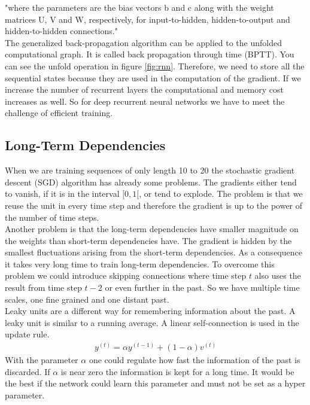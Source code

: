 "where the parameters are the bias vectors b and c along with the weight matrices U, V and W, respectively, for input-to-hidden, hidden-to-output and hidden-to-hidden connections."\cite[p.374]{DeepLearning}\\
The generalized back-propagation algorithm can be applied to the unfolded computational graph. It is called back propagation through time (BPTT). You can see the unfold operation in figure \ref{fig:rnn}. Therefore, we need to store all the sequential states because they are used in the computation of the gradient. If we increase the number of recurrent layers the computational and memory cost increases as well. So for deep recurrent neural networks we have to meet the challenge of efficient training.

\subsection{Long-Term Dependencies}
\label{sec:ltd}
When we are training sequences of only length 10 to 20 the stochastic gradient descent (SGD) algorithm has already some problems. The gradients either tend to vanish, if it is in the interval $[0, 1[$, or tend to explode. The problem is that we reuse the unit in every time step and therefore the gradient is up to the power of the number of time steps.\\
Another problem is that the long-term dependencies have smaller magnitude on the weights than short-term dependencies have. The gradient is hidden by the smallest fluctuations arising from the short-term dependencies. As a consequence it takes very long time to train long-term dependencies. To overcome this problem we could introduce skipping connections where time step $t$ also uses the result from time step $t-2$ or even further in the past. So we have multiple time scales, one fine grained and one distant past.\\
Leaky units are a different way for remembering information about the past. A leaky unit is similar to a running average. A linear self-connection is used in the update rule.
\begin{align}
y^{(t)} = \alpha y^{(t-1)} + (1-\alpha)v^{(t)}
\end{align}
With the parameter $\alpha$ one could regulate how fast the information of the past is discarded. If $\alpha$ is near zero the information is kept for a long time. It would be the best if the network could learn this parameter and must not be set as a hyper parameter.

